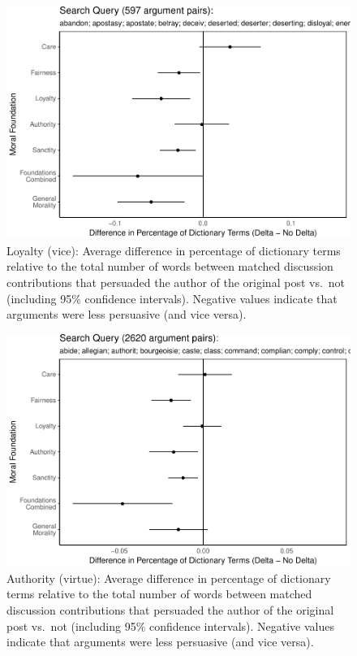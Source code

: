\documentclass[12pt,]{article}
\begin{document}
\begin{figure}
\centering
\includegraphics{prelim_files/figure-latex/ingroup vice-1.pdf}
\caption{Loyalty (vice): Average difference in percentage of dictionary
terms relative to the total number of words between matched discussion
contributions that persuaded the author of the original post vs.~not
(including 95\% confidence intervals). Negative values indicate that
arguments were less persuasive (and vice versa).}
\end{figure}

\begin{figure}
\centering
\includegraphics{prelim_files/figure-latex/authority virtue-1.pdf}
\caption{Authority (virtue): Average difference in percentage of
dictionary terms relative to the total number of words between matched
discussion contributions that persuaded the author of the original post
vs.~not (including 95\% confidence intervals). Negative values indicate
that arguments were less persuasive (and vice versa).}
\end{figure}
\end{document}
